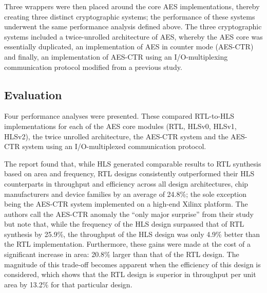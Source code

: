 \documentclass[12pt,journal,compsoc,onecolumn]{IEEEtran}
\begin{document}
Three wrappers were then placed around the core AES implementations, thereby creating three distinct cryptographic systems; the performance of these systems underwent the same performance analysis defined above. The three cryptographic systems included a twice-unrolled architecture of AES, whereby the AES core was essentially duplicated, an implementation of AES in counter mode (AES-CTR) and finally, an implementation of AES-CTR using an I/O-multiplexing communication protocol modified from a previous study\cite{20}.


\subsection{Evaluation}\label{sec:evaluation}

Four performance analyses were presented. These compared RTL-to-HLS implementations for each of the AES core modules (RTL, HLSv0, HLSv1, HLSv2), the twice unrolled architecture, the AES-CTR system and the AES-CTR system using an I/O-multiplexed communication protocol. 

The report found that, while HLS generated comparable results to RTL synthesis based on area and frequency, RTL designs consistently outperformed their HLS counterparts in throughput and efficiency across all design architectures, chip manufacturers and device families by an average of 24.8\%; the sole exception being the AES-CTR system implemented on a high-end Xilinx platform. The authors call the AES-CTR anomaly the ``only major surprise'' from their study but note that, while the frequency of the HLS design surpassed that of RTL synthesis by 25.9\%, the throughput of the HLS design was only 4.9\% better than the RTL implementation. Furthermore, these gains were made at the cost of a significant increase in area: 20.8\% larger than that of the RTL design. The magnitude of this trade-off becomes apparent when the efficiency of this design is considered, which shows that the RTL design is superior in throughput per unit area by 13.2\% for that particular design.
\end{document}
